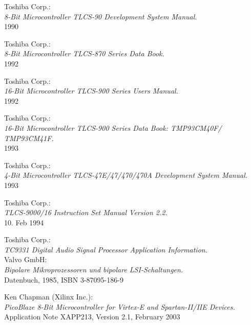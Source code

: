  Toshiba Corp.: \\
                 {\em 8-Bit Microcontroller TLCS-90 Development System
                 Manual.\/} \\
                 1990

 Toshiba Corp.: \\
                  {\em 8-Bit Microcontroller TLCS-870 Series Data
                  Book.\/} \\
                  1992

 Toshiba Corp.: \\
                  {\em 16-Bit Microcontroller TLCS-900 Series Users
                  Manual.\/} \\
                  1992

 Toshiba Corp.: \\
                   {\em 16-Bit Microcontroller TLCS-900 Series Data Book:
                    TMP93CM40F/ TMP93CM41F.\/} \\
                   1993

 Toshiba Corp.: \\
                 {\em 4-Bit Microcontroller TLCS-47E/47/470/470A Development
                  System Manual.\/} \\
                 1993

 Toshiba Corp.: \\
                   {\em TLCS-9000/16 Instruction Set Manual Version
                   2.2.\/} \\
                   10. Feb 1994

 Toshiba Corp.: \\
                   {\em TC9331 Digital Audio Signal Processor
                   Application Information.} \\

 Valvo GmbH: \\
                {\em Bipolare Mikroprozessoren und bipolare
                LSI-Schaltungen.\/} \\
                Datenbuch, 1985, ISBN 3-87095-186-9

 Ken Chapman (Xilinx Inc.):\\
                 {\em PicoBlaze 8-Bit Microcontroller for Virtex-E
                 and Spartan-II/IIE Devices.\/} \\
                 Application Note XAPP213, Version 2.1, February 2003

